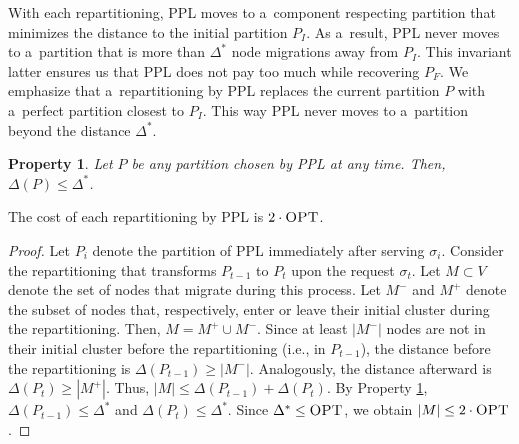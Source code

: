 \documentclass[a4paper,anonymous,USenglish]{lipics-v2019}
\newcommand{\OPT}{\textsc{OPT}\xspace}
\newcommand{\PPL}{\textsc{PPL}\xspace}
\newtheorem{property}{Property}
\begin{document}
With each repartitioning,
\PPL moves to a~component respecting partition that minimizes the distance to the initial partition $P_I$.
As a~result,
\PPL never moves to a~partition that is more than $\Delta^*$  node migrations away from $P_I$.
This invariant latter ensures us that \PPL does not pay too much while recovering $P_F$.
We emphasize that a~repartitioning by \PPL replaces the current partition $P$ with a~perfect partition closest to $P_I$.
This way \PPL never moves to a~partition beyond the distance $\Delta^*$.

\begin{property} \label{prop:dist<OPT}
	Let $P$ be any partition chosen by \PPL at any time.
	Then, $\Delta(P) \leq \Delta^*$.	
\end{property}

\begin{lemma}	\label{lemma:rebalancecost}
	The cost of each repartitioning by \PPL is $2\cdot\OPT$.
\end{lemma}
\begin{proof}
	Let $P_i$ denote the partition of \PPL immediately after serving $\sigma_{i}$.
	Consider the repartitioning that transforms 
	$P_{t-1}$ to $P_t$ upon the request $\sigma_t$.
	Let $M \subset V$ denote the set of nodes that migrate during this process.
	Let $M^-$ and $M^+$ denote the subset of nodes that, respectively,
	enter or leave their initial cluster during the repartitioning.    
	Then,
	$M = M^+ \cup M^-$.
	Since at least $|M^-|$ nodes are not in their initial cluster before the repartitioning (i.e., in $P_{t-1}$),
	the distance before the repartitioning is $\Delta(P_{t-1}) \geq | M^-|$.
	Analogously,
	the distance afterward is $\Delta(P_{t}) \geq | M^+|$.
	Thus,
	$|M| \leq \Delta(P_{t-1}) + \Delta(P_{t})$.
	By Property \ref{prop:dist<OPT},
	$\Delta(P_{t-1})  \leq \Delta^*$ and
	$\Delta(P_{t}) \leq \Delta^*$.
	Since $\Delta^* \leq \OPT$,
	we obtain	 $|M| \leq 2\cdot\OPT$.
\end{proof}
\end{document}
